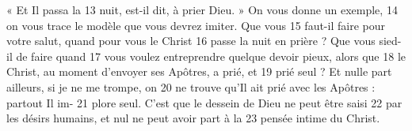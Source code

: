 « Et Il passa la	 
13	 	nuit, est-il dit, à prier Dieu. » On vous donne un exemple,	 
14	 	on vous trace le modèle que vous devrez imiter. Que vous	 
15	 	faut-il faire pour votre salut, quand pour vous le Christ	 
16	 	passe la nuit en prière ? Que vous sied-il de faire quand	 
17	 	vous voulez entreprendre quelque devoir pieux, alors que	 
18	 	le Christ, au moment d'envoyer ses Apôtres, a prié, et	 
19	 	prié seul ? Et nulle part ailleurs, si je ne me trompe, on	 
20	 	ne trouve qu'Il ait prié avec les Apôtres : partout Il im-	 
21	 	plore seul. C'est que le dessein de Dieu ne peut être saisi	 
22	 	par les désirs humains, et nul ne peut avoir part à la	 
23	 	pensée intime du Christ.